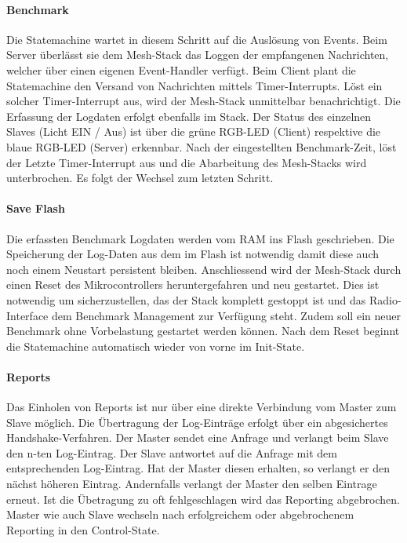 \paragraph{Benchmark}
Die Statemachine wartet in diesem Schritt auf die Auslösung von Events.
Beim Server überlässt sie dem Mesh-Stack das Loggen der empfangenen Nachrichten, welcher über einen eigenen Event-Handler verfügt.
Beim Client plant die Statemachine den Versand von Nachrichten mittels Timer-Interrupts.
Löst ein solcher Timer-Interrupt aus, wird der Mesh-Stack unmittelbar benachrichtigt.
Die Erfassung der Logdaten erfolgt ebenfalls im Stack.
Der Status des einzelnen Slaves (Licht EIN / Aus) ist über die grüne RGB-LED (Client) respektive die blaue RGB-LED (Server) erkennbar.
Nach der eingestellten Benchmark-Zeit, löst der Letzte Timer-Interrupt aus und die Abarbeitung des Mesh-Stacks wird unterbrochen.
Es folgt der Wechsel zum letzten Schritt.

\paragraph{Save Flash}
Die erfassten Benchmark Logdaten werden vom RAM ins Flash geschrieben.
Die Speicherung der Log-Daten aus dem im Flash ist notwendig damit diese auch noch einem Neustart persistent bleiben.
Anschliessend wird der Mesh-Stack durch einen Reset des Mikrocontrollers heruntergefahren und neu gestartet.
Dies ist notwendig um sicherzustellen, das der Stack komplett gestoppt ist und das Radio-Interface dem Benchmark Management zur Verfügung steht.
Zudem soll ein neuer Benchmark ohne Vorbelastung gestartet werden können.
Nach dem Reset beginnt die Statemachine automatisch wieder von vorne im Init-State. 

\paragraph{Reports}
Das Einholen von Reports ist nur über eine direkte Verbindung vom Master zum Slave möglich.
Die Übertragung der Log-Einträge erfolgt über ein abgesichertes Handshake-Verfahren.
Der Master sendet eine Anfrage und verlangt beim Slave den n-ten Log-Eintrag.
Der Slave antwortet auf die Anfrage mit dem entsprechenden Log-Eintrag.
Hat der Master diesen erhalten, so verlangt er den nächst höheren Eintrag.
Andernfalls verlangt der Master den selben Eintrage erneut.
Ist die Übetragung zu oft fehlgeschlagen wird das Reporting abgebrochen.
Master wie auch Slave wechseln nach erfolgreichem oder abgebrochenem Reporting in den Control-State.  

